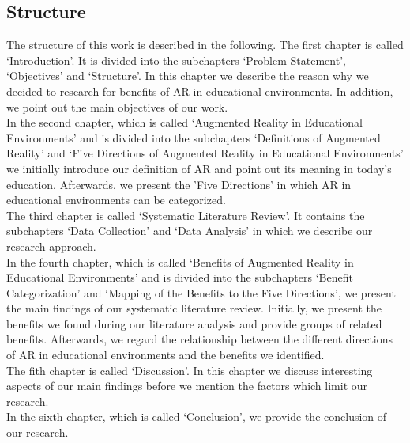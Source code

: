 \subsection{Structure}
The structure of this work is described in the following. The first chapter is called ‘Introduction’. It is divided into the subchapters ‘Problem Statement’, ‘Objectives’ and ‘Structure’. In this chapter we describe the reason why we decided to research for benefits of AR in educational environments. In addition, we point out the main objectives of our work.\\
In the second chapter, which is called ‘Augmented Reality in Educational Environments’ and is divided into the subchapters ‘Definitions of Augmented Reality’ and ‘Five Directions of Augmented Reality in Educational Environments’ we initially introduce our definition of AR and point out its meaning in today's education. Afterwards, we present the 'Five Directions' \autocite [cf.][]{Yuen.2011} in which AR in educational environments can be categorized.\\
The third chapter is called ‘Systematic Literature Review’. It contains the subchapters ‘Data Collection’ and ‘Data Analysis’ in which we describe our research approach.\\
In the fourth chapter, which is called ‘Benefits of Augmented Reality in Educational Environments’ and is divided into the subchapters ‘Benefit Categorization’ and ‘Mapping of the Benefits to the Five Directions’, we present the main findings of our systematic literature review. Initially, we present the benefits we found during our literature analysis and provide groups of related benefits. Afterwards, we regard the relationship between the different directions of AR in educational environments and the benefits we identified.\\
The fith chapter is called ‘Discussion’. In this chapter we discuss interesting aspects of our main findings before we mention the factors which limit our research.\\
In the sixth chapter, which is called ‘Conclusion’, we provide the conclusion of our research.